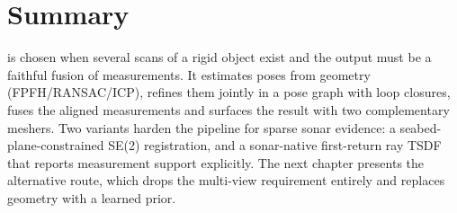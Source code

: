 \section{Summary}
\label{sec:routea_summary}

\routeA{} is chosen when several scans of a rigid object exist and the output
must be a faithful fusion of measurements. It estimates poses from geometry
(FPFH/RANSAC/ICP), refines them jointly in a pose graph with loop closures,
fuses the aligned measurements and surfaces the result with two complementary
meshers. Two variants harden the pipeline for sparse sonar evidence: a
seabed-plane-constrained SE(2) registration, and a sonar-native first-return
ray TSDF that reports measurement support explicitly. The next chapter
presents the alternative route, which drops the multi-view requirement
entirely and replaces geometry with a learned prior.
